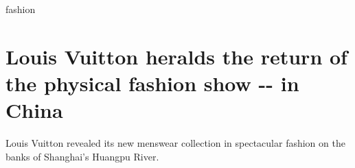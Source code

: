 \href{/}{}\href{/style}{}

\href{/style/fashion}{}

fashion

\href{/style/article/louis-vuitton-ss21-shanghai/index.html}{}

\hypertarget{louis-vuitton-heralds-the-return-of-the-physical-fashion-show----in-china}{%
\section{Louis Vuitton heralds the return of the physical fashion show
-\/- in
China}\label{louis-vuitton-heralds-the-return-of-the-physical-fashion-show----in-china}}

\href{/style/article/louis-vuitton-ss21-shanghai/index.html}{}

Louis Vuitton revealed its new menswear collection in spectacular
fashion on the banks of Shanghai's Huangpu River.


